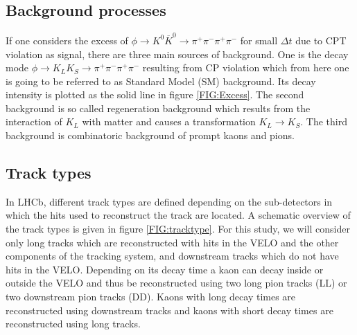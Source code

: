 \subsection{Background processes}

If one considers the excess of $\phi \rightarrow K^0 \overline{K}^0 \rightarrow \pi^+ \pi^- \pi^+ \pi^-$ for small $\Delta t$ due to CPT violation as signal, there are three main sources of background. One is the decay mode $\phi \rightarrow K_L K_S \rightarrow \pi^+\pi^-\pi^+\pi^-$ resulting from CP violation which from here one is going to be referred to as Standard Model (SM) background. Its decay intensity is plotted as the solid line in figure \ref{FIG:Excess}. The second background is so called regeneration background which results from the interaction of $K_L$ with matter and causes a transformation $K_L \rightarrow K_S$. The third background is combinatoric background of prompt kaons and pions.

\subsection{Track types}

In LHCb, different track types are defined depending on the sub-detectors in which the hits used to reconstruct the track are located. A schematic overview of the track types is given in figure \ref{FIG:tracktype}. For this study, we will consider only long tracks which are reconstructed with hits in the VELO and the other components of the tracking system, and downstream tracks which do not have hits in the VELO. Depending on its decay time a kaon can decay inside or outside the VELO and thus be reconstructed using two long pion tracks (LL) or two downstream pion tracks (DD). Kaons with long decay times are reconstructed using downstream tracks and kaons with short decay times are reconstructed using long tracks.


\begin{center}
    \def\svgwidth{.9\textwidth}
    
\label{FIG:tracktype}
\end{center}
